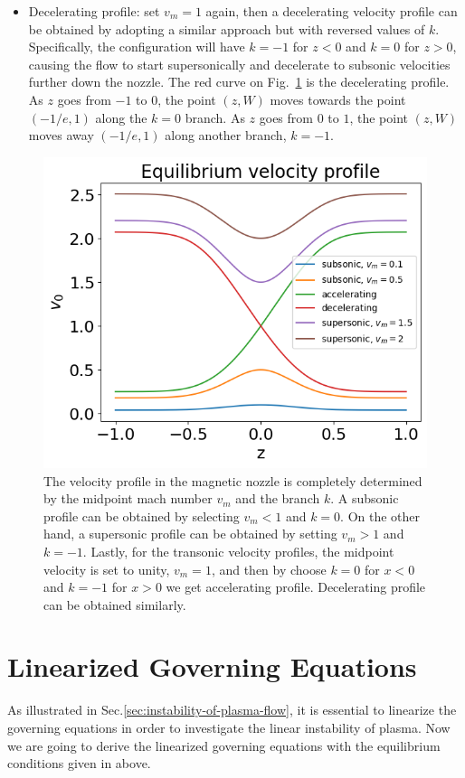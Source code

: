 \begin{itemize}
	\item Decelerating profile: set $v_m = 1$ again, then a decelerating velocity profile can be obtained by adopting a similar approach but with reversed values of $k$. Specifically, the configuration will have $k = -1$ for $z < 0$ and $k = 0$ for $z > 0$, causing the flow to start supersonically and decelerate to subsonic velocities further down the nozzle. The red curve on Fig.~\ref{fig:velocity-profiles} is the decelerating profile. As $z$ goes from $-1$ to $0$, the point $(z,W)$ moves towards the point $(-1/e, 1)$ along the $k=0$ branch. As $z$ goes from $0$ to $1$, the point $(z, W)$ moves away $(-1/e,1)$ along another branch, $k=-1$.
\end{itemize}


\begin{figure}[htbp]
	\centering
	\includegraphics[width=0.7\linewidth]{figures/velocity-profiles}
	\caption{The velocity profile in the magnetic nozzle is completely determined by the midpoint mach number $v_m$ and the branch $k$. A subsonic profile can be obtained by selecting $v_m<1$ and $k=0$. On the other hand, a supersonic profile can be obtained by setting $v_m>1$ and $k=-1$. Lastly, for the transonic velocity profiles, the midpoint velocity is set to unity, $v_m=1$, and then by choose $k=0$ for $x<0$ and $k=-1$ for $x>0$ we get accelerating profile. Decelerating profile can be obtained similarly.}
	\label{fig:velocity-profiles}
\end{figure}

\section{Linearized Governing Equations}
As illustrated in Sec.\ref{sec:instability-of-plasma-flow}, it is essential to linearize the governing equations in order to investigate the linear instability of plasma. Now we are going to derive the linearized governing equations with the equilibrium conditions given in above.

